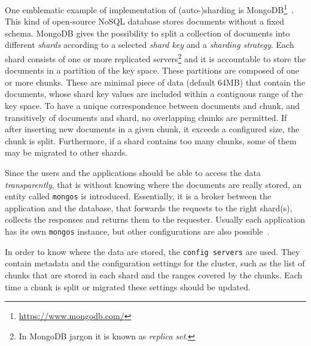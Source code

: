 One emblematic example of implementation of (auto-)sharding is
MongoDB\footnote{\url{https://www.mongodb.com/}}~\cite{bib:mongodb}. This kind
of open-source NoSQL database stores documents without a fixed schema.
MongoDB gives the possibility to split a collection of documents into different
\emph{shards} according to a selected \emph{shard key} and a \emph{sharding
strategy}. Each shard consists of one or more replicated servers\footnote{In
MongoDB jargon it is known as \emph{replica set}.} and it is accountable to
store the documents in a partition of the key space. These partitions are
composed of one or more chunks. These are minimal piece of data (default 64MB)
that contain the documents, whose shard key values are included within a
contiguous range of the key space. To have a unique correspondence between
documents and chunk, and transitively of documents and shard, no overlapping
chunks are permitted. If after inserting new documents in a given chunk, it
exceeds a configured size, the chunk is split. Furthermore, if a shard contains
too many chunks, some of them may be migrated to other shards.

Since the users and the applications should be able to access the data
\emph{transparently}, that is without knowing where the documents are really
stored, an entity called \texttt{mongos} is introduced. Essentially, it is a
broker between the application and the database, that forwards the requests to
the right shard(s), collects the responses and returns them to the requester.
Usually each application has its own \texttt{mongos} instance, but other
configurations are also possible~\cite{bib:mongodb}.

In order to know where the data are stored, the \texttt{config servers} are
used. They contain metadata and the configuration settings for the cluster, such
as the list of chunks that are stored in each shard and the ranges covered by
the chunks. Each time a chunk is split or migrated these settings should be
updated.

